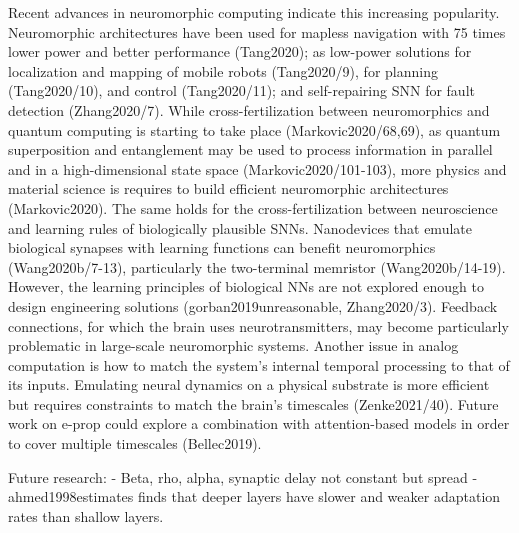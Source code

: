     Recent advances in neuromorphic computing indicate this increasing popularity.
    Neuromorphic architectures have been used for mapless navigation with 75 times lower power and better performance (Tang2020); as low-power solutions for localization and mapping of mobile robots (Tang2020/9), for planning (Tang2020/10), and control (Tang2020/11); and self-repairing SNN for fault detection (Zhang2020/7).
    While cross-fertilization between neuromorphics and quantum computing is starting to take place (Markovic2020/68,69), as quantum superposition and entanglement may be used to process information in parallel and in a high-dimensional state space (Markovic2020/101-103), more physics and material science is requires to build efficient neuromorphic architectures (Markovic2020).
    The same holds for the cross-fertilization between neuroscience and learning rules of biologically plausible SNNs.
    Nanodevices that emulate biological synapses with learning functions can benefit neuromorphics (Wang2020b/7-13), particularly the two-terminal memristor (Wang2020b/14-19). However, the learning principles of biological NNs are not explored enough to design engineering solutions (gorban2019unreasonable, Zhang2020/3).
    Feedback connections, for which the brain uses neurotransmitters, may become particularly problematic in large-scale neuromorphic systems.
    Another issue in analog computation is how to match the system's internal temporal processing to that of its inputs.
    Emulating neural dynamics on a physical substrate is more efficient but requires constraints to match the brain's timescales (Zenke2021/40).
    Future work on e-prop could explore a combination with attention-based models in order to cover multiple timescales (Bellec2019).




\begin{tcolorbox}[colback=orange]
Future research:
- Beta, rho, alpha, synaptic delay not constant but spread
- ahmed1998estimates finds that deeper layers have slower and weaker adaptation rates than shallow layers.
\end{tcolorbox}
